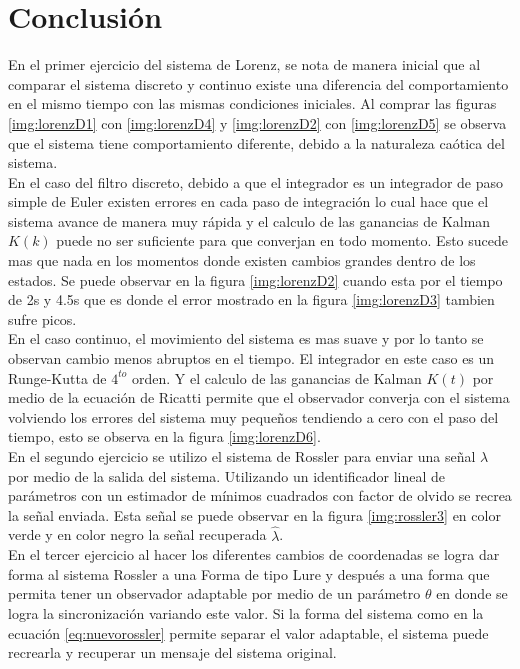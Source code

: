 \section*{Conclusión}

En el primer ejercicio del sistema de Lorenz, se nota de manera inicial que al comparar el sistema discreto y continuo existe una diferencia del comportamiento en el mismo tiempo con las mismas condiciones iniciales. Al comprar las figuras \ref{img:lorenzD1} con \ref{img:lorenzD4} y \ref{img:lorenzD2} con \ref{img:lorenzD5} se observa que el sistema tiene comportamiento diferente, debido a la naturaleza caótica del sistema.\\

En el caso del filtro discreto, debido a que el integrador es un integrador de paso simple de Euler existen errores en cada paso de integración lo cual hace que el sistema avance de manera muy rápida y el calculo de las ganancias de Kalman $K(k)$ puede no ser suficiente para que converjan en todo momento. Esto sucede mas que nada en los momentos donde existen cambios grandes dentro de los estados. Se puede observar en la figura \ref{img:lorenzD2} cuando esta por el tiempo de 2s y 4.5s que es donde el error mostrado en la figura \ref{img:lorenzD3} tambien sufre picos.\\

En el caso continuo, el movimiento del sistema es mas suave y por lo tanto se observan cambio menos abruptos en el tiempo. El integrador en este caso es un Runge-Kutta de $4^{to}$ orden. Y el calculo de las ganancias de Kalman $K(t)$ por medio de la ecuación de Ricatti permite que el observador converja con el sistema volviendo los errores del sistema muy pequeños tendiendo a cero con el paso del tiempo, esto se observa en la figura \ref{img:lorenzD6}.\\

En el segundo ejercicio se utilizo el sistema de Rossler para enviar una señal $\lambda$ por medio de la salida del sistema. Utilizando un identificador lineal de parámetros con un estimador de mínimos cuadrados con factor de olvido se recrea la señal enviada. Esta señal se puede observar en la figura \ref{img:rossler3} en color verde y en color negro la señal recuperada $\hat{\lambda}$.\\

En el tercer ejercicio al hacer los diferentes cambios de coordenadas se logra dar forma al sistema Rossler a una Forma de tipo Lure y después a una forma que permita tener un observador adaptable por medio de un parámetro $\theta$ en donde se logra la sincronización variando este valor. Si la forma del sistema como en la ecuación \ref{eq:nuevorossler} permite separar el valor adaptable, el sistema puede recrearla y recuperar un mensaje del sistema original.